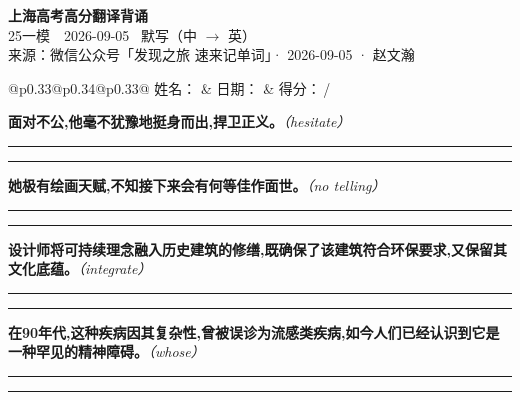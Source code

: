\documentclass[11pt,a4paper]{article}
\newcommand{\num}[1]{\makebox[1.9em][r]{#1.}\hspace{0.3em}}
\newcommand{\wline}{\noindent\rule{\linewidth}{0.4pt}}
\newcommand{\prompt}[1]{\emph{\textcolor{tipblue}{\small（#1）}}}
\begin{document}
\pagestyle{plain}
\begin{center}
{\LARGE\bfseries 上海高考高分翻译背诵 }\\[0.25em]
{\large 25一模　2026-09-05 \quad\ 默写（中 $\to$ 英）}\\[0.35em]
{\footnotesize 来源：微信公众号「发现之旅 速来记单词」· 2026-09-05 · 赵文瀚}
\end{center}

\vspace{0.4em}
\noindent\begin{tabular}{@{}p{0.33\textwidth}@{}p{0.34\textwidth}@{}p{0.33\textwidth}@{}}
姓名：\underline{\hspace{2.0cm}} & 日期：\underline{\hspace{2.0cm}} & 得分：\underline{\hspace{1.4cm}}\,/ \\
\end{tabular}

\vspace{0.5em}

\vspace{0.8em}
\num{1}\textbf{面对不公,他毫不犹豫地挺身而出,捍卫正义。}\prompt{hesitate}

\vspace{0.3em}

\wline\vspace{0.3em}
\wline

\num{2}\textbf{她极有绘画天赋,不知接下来会有何等佳作面世。}\prompt{no telling}

\vspace{0.3em}

\wline\vspace{0.3em}
\wline

\num{3}\textbf{设计师将可持续理念融入历史建筑的修缮,既确保了该建筑符合环保要求,又保留其文化底蕴。}\prompt{integrate}

\vspace{0.3em}

\wline\vspace{0.3em}
\wline

\num{4}\textbf{在90年代,这种疾病因其复杂性,曾被误诊为流感类疾病,如今人们已经认识到它是一种罕见的精神障碍。}\prompt{whose}

\vspace{0.3em}

\wline\vspace{0.3em}
\wline
\end{document}
